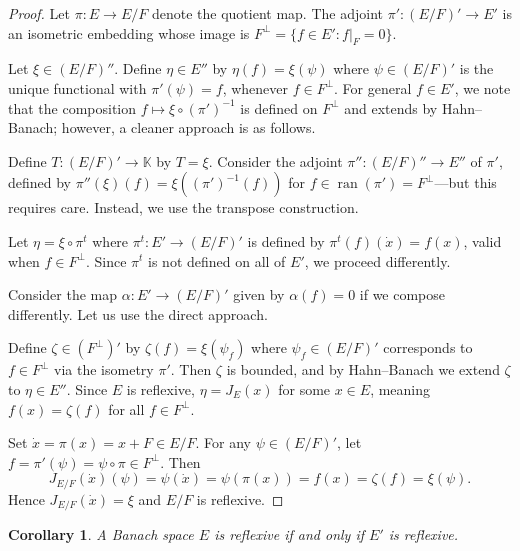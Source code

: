\documentclass[a4paper,12pt]{book}
\DeclareMathOperator{\ran}{ran}
\newcommand{\K}{\mathbb{K}}
\theoremstyle{definition}
\theoremstyle{plain}
\newtheorem{corollary}[definition]{Corollary}
\theoremstyle{remark}
\begin{document}
\begin{proof}
Let $\pi:E\to E/F$ denote the quotient map.  The adjoint
$\pi':(E/F)'\to E'$ is an isometric embedding whose image is
$F^\perp = \{f\in E': f\big|_F = 0\}$.

Let $\xi\in(E/F)''$.  Define $\eta\in E''$ by
$\eta(f) = \xi(\psi)$ where $\psi\in(E/F)'$ is the unique functional with
$\pi'(\psi)=f$, whenever $f\in F^\perp$.  For general $f\in E'$, we note that
the composition $f\mapsto \xi\circ(\pi')^{-1}$ is defined on $F^\perp$ and extends
by Hahn--Banach; however, a cleaner approach is as follows.

Define $T:(E/F)'\to\K$ by $T = \xi$.  Consider the adjoint
$\pi'': (E/F)''\to E''$ of $\pi'$, defined by
$\pi''(\xi)(f) = \xi((\pi')^{-1}(f))$ for $f\in\ran(\pi')=F^\perp$---but
this requires care.  Instead, we use the transpose construction.

Let $\eta = \xi\circ\pi^{t}$ where $\pi^t: E'\to (E/F)'$ is defined by
$\pi^t(f)(\dot{x}) = f(x)$, valid when $f\in F^\perp$.  Since $\pi^t$ is not
defined on all of $E'$, we proceed differently.

Consider the map $\alpha: E' \to (E/F)'$ given by
$\alpha(f) = 0$ if we compose differently.  Let us use the direct approach.

Define $\zeta \in (F^\perp)' $ by $\zeta(f) = \xi(\psi_f)$ where
$\psi_f\in(E/F)'$ corresponds to $f\in F^\perp$ via the isometry $\pi'$.
Then $\zeta$ is bounded, and by Hahn--Banach we extend $\zeta$ to
$\eta\in E''$.  Since $E$ is reflexive, $\eta = J_E(x)$ for some $x\in E$,
meaning $f(x)=\zeta(f)$ for all $f\in F^\perp$.

Set $\dot{x} = \pi(x) = x + F \in E/F$.  For any $\psi\in(E/F)'$, let
$f = \pi'(\psi) = \psi\circ\pi \in F^\perp$.  Then
\[
  J_{E/F}(\dot{x})(\psi) = \psi(\dot{x}) = \psi(\pi(x)) = f(x)
  = \zeta(f) = \xi(\psi).
\]
Hence $J_{E/F}(\dot{x}) = \xi$ and $E/F$ is reflexive.
\end{proof}

\begin{corollary}\label{cor:reflexive-iff-dual}
A Banach space $E$ is reflexive if and only if $E'$ is reflexive.
\end{corollary}
\end{document}
